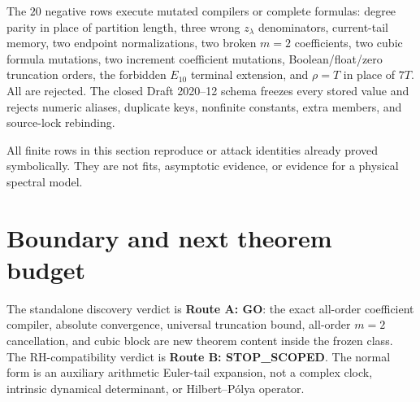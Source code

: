 \documentclass[11pt]{article}
\theoremstyle{definition}
\theoremstyle{remark}
\begin{document}
The $20$ negative rows execute mutated compilers or complete formulas:
degree parity in place of partition length, three wrong $z_\lambda$
denominators, current-tail memory, two endpoint normalizations, two broken
$m=2$ coefficients, two cubic formula mutations, two increment coefficient
mutations, Boolean/float/zero truncation orders, the forbidden $E_{10}$
terminal extension, and $\rho=T$ in place of $7T$.  All are rejected.  The
closed Draft 2020--12 schema freezes every stored value and rejects numeric
aliases, duplicate keys, nonfinite constants, extra members, and source-lock
rebinding.

All finite rows in this section reproduce or attack identities already
proved symbolically.  They are not fits, asymptotic evidence, or evidence
for a physical spectral model.

\section{Boundary and next theorem budget}

The standalone discovery verdict is \textbf{Route A: GO}: the exact
all-order coefficient compiler, absolute convergence, universal truncation
bound, all-order $m=2$ cancellation, and cubic block are new theorem content
inside the frozen class.  The RH-compatibility verdict is
\textbf{Route B: STOP\_SCOPED}.  The normal form is an auxiliary arithmetic
Euler-tail expansion, not a complex clock, intrinsic dynamical determinant,
or Hilbert--P\'olya operator.
\end{document}
